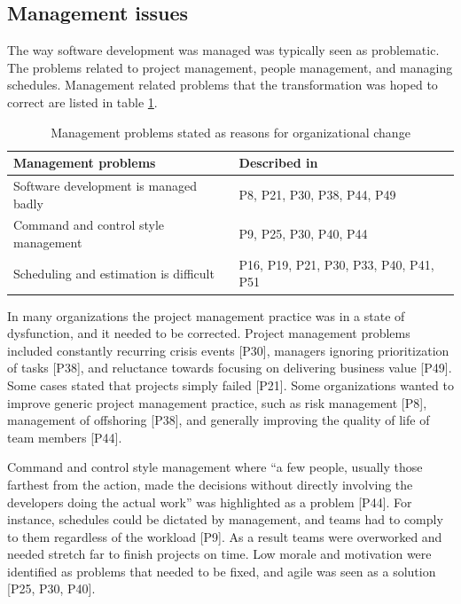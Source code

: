 \subsection{Management issues}

The way software development was managed was typically seen as problematic. The
problems related to project management, people management, and managing
schedules. Management related problems that the transformation was hoped to
correct are listed in table \ref{table:reasonstochange_management}.

\begin{table}[b]
    \centering
    \begin{tabular}{ >{\raggedright\arraybackslash}p{}
                     >{\raggedright\arraybackslash}p{} }
        \toprule
        Management problems           &  Described in  \\
        \midrule
        Software development is managed badly   &  P8, P21, P30, P38, P44, P49  \\
        Command and control style management    &  P9, P25, P30, P40, P44  \\
        Scheduling and estimation is difficult  &  P16, P19, P21, P30, P33, P40, P41, P51  \\
        \bottomrule
    \end{tabular}
    \caption{Management problems stated as reasons for organizational change}
    \label{table:reasonstochange_management}
\end{table}

In many organizations the project management practice was in a state of
dysfunction, and it needed to be corrected. Project management problems included
constantly recurring crisis events [P30], managers ignoring prioritization of
tasks [P38], and reluctance towards focusing on delivering business value [P49].
Some cases stated that projects simply failed [P21]. Some organizations wanted
to improve generic project management practice, such as risk management [P8],
management of offshoring [P38], and generally improving the quality of life of
team members [P44].

Command and control style management where ``a few people, usually those
farthest from the action, made the decisions without directly involving the
developers doing the actual work'' was highlighted as a problem [P44]. For
instance, schedules could be dictated by management, and teams had to comply to
them regardless of the workload [P9]. As a result teams were overworked and
needed stretch far to finish projects on time. Low morale and motivation were
identified as problems that needed to be fixed, and agile was seen as a solution
[P25, P30, P40].

